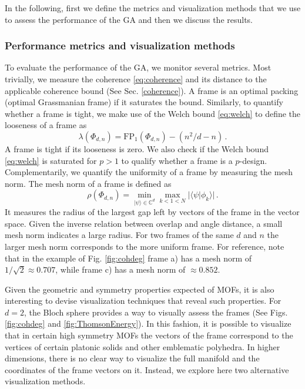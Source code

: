 \documentclass[%
superscriptaddress,
amsmath,amssymb,
 aps,
pra,
floatfix,
]{revtex4-2}
\begin{document}
In the following, first we define the metrics and visualization methods that we use to assess the performance of the GA and then we discuss the results.

\subsubsection{Performance metrics and visualization methods}
\label{subsec:metricsbounds}

To evaluate the performance of the GA, we monitor several metrics. Most trivially, we measure the coherence \eqref{eq:coherence} and its distance to the applicable coherence bound (See Sec. \ref{coherence}). A frame is an optimal packing (optimal Grassmanian frame) if it saturates the bound. Similarly, to quantify whether a frame is tight, we make use of the Welch bound \eqref{eq:welch} to define the looseness of a frame as 
%
\begin{equation}
    \lambda(\Phi_{d, n}) = \mathrm{FP}_1(\Phi_{d, n}) - (n^2/d - n) \,.
    \label{eq:looseness}
\end{equation}
%
A frame is tight if its looseness is zero. We also check if the Welch bound \eqref{eq:welch} is saturated for $p > 1$ to qualify whether a frame is a $p$-design. Complementarily, we quantify the uniformity of a frame by measuring the mesh norm. The mesh norm of a frame is defined as
%
\begin{equation}
\label{eq:meshnorm}
    \rho(\Phi_{d, n}) = \min_{|\psi\rangle\in\mathbb C^d}\max_{k<1<N}|\langle\psi|\phi_k\rangle| \,.
\end{equation}
%
It measures the radius of the largest gap left by vectors of the frame in the vector space. Given the inverse relation between overlap and angle distance, a small mesh norm indicates a large radius. For two frames of the same $d$ and $n$ the larger mesh norm corresponds to the more uniform frame. For reference, note that in the example of Fig. \ref{fig:cohdeg} frame a) has a mesh norm of $1/\sqrt{2} \approx 0.707$, while frame c) has a mesh norm of $\approx 0.852$.

Given the geometric and symmetry properties expected of MOFs, it is also interesting to devise visualization techniques that reveal such properties.
For $d=2$, the Bloch sphere provides a way to visually assess the frames (See Figs. \ref{fig:cohdeg} and \ref{fig:ThomsonEnergy}).
In this fashion, it is possible to visualize that in certain high symmetry MOFs the vectors of the frame correspond to the vertices of certain platonic solids and other emblematic polyhedra.
In higher dimensions, there is no clear way to visualize the full manifold and the coordinates of the frame vectors on it. Instead, we explore here two alternative visualization methods.
\end{document}
